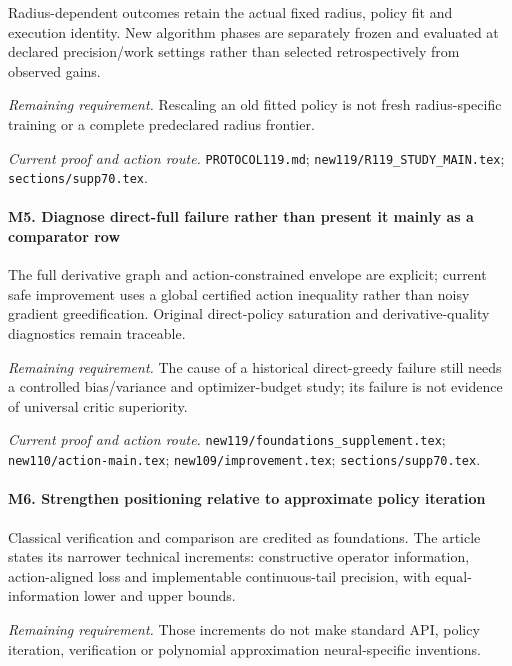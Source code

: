 Radius-dependent outcomes retain the actual fixed radius, policy fit and execution identity. New algorithm phases are separately frozen and evaluated at declared precision/\allowbreak{}work settings rather than selected retrospectively from observed gains.

\par\emph{Remaining requirement.} Rescaling an old fitted policy is not fresh radius-specific training or a complete predeclared radius frontier.

\par\emph{Current proof and action route.} \nolinkurl{PROTOCOL119.md}; \nolinkurl{new119/R119_STUDY_MAIN.tex}; \nolinkurl{sections/supp70.tex}.

\paragraph{M5. Diagnose direct-full failure rather than present it mainly as a comparator row}

The full derivative graph and action-constrained envelope are explicit; current safe improvement uses a global certified action inequality rather than noisy gradient greedification. Original direct-policy saturation and derivative-quality diagnostics remain traceable.

\par\emph{Remaining requirement.} The cause of a historical direct-greedy failure still needs a controlled bias/\allowbreak{}variance and optimizer-budget study; its failure is not evidence of universal critic superiority.

\par\emph{Current proof and action route.} \nolinkurl{new119/foundations_supplement.tex}; \nolinkurl{new110/action-main.tex}; \nolinkurl{new109/improvement.tex}; \nolinkurl{sections/supp70.tex}.

\paragraph{M6. Strengthen positioning relative to approximate policy iteration}

Classical verification and comparison are credited as foundations. The article states its narrower technical increments: constructive operator information, action-aligned loss and implementable continuous-tail precision, with equal-information lower and upper bounds.

\par\emph{Remaining requirement.} Those increments do not make standard API, policy iteration, verification or polynomial approximation neural-specific inventions.

